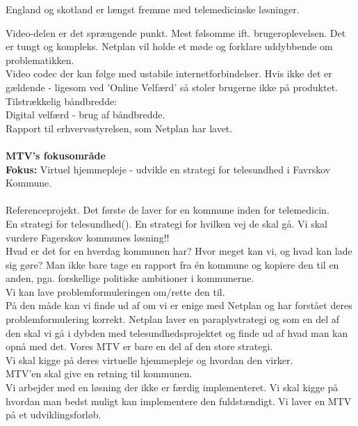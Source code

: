 England og skotland er længst fremme med telemedicinske løsninger. 


Video-delen er det sprængende punkt. Mest følsomme ift. brugeroplevelsen. Det er tungt og kompleks. Netplan vil holde et møde og forklare uddybbende om problematikken. \\
Video codec der kan følge med ustabile internetforbindelser. Hvis ikke det er gældende - ligesom ved 'Online Velfærd' så stoler brugerne ikke på produktet. \\

Tilstrækkelig båndbredde:\\
Digital velfærd - brug af båndbredde.\\
Rapport til erhvervsstyrelsen, som Netplan har lavet.\\\\

\textbf{MTV's fokusområde}\\
\textbf{Fokus:} Virtuel hjemmepleje - udvikle en strategi for telesundhed i Favrskov Kommune.
\\\\
Referenceprojekt. Det første de laver for en kommune inden for telemedicin.\\
En strategi for telesundhed(). En strategi for hvilken vej de skal gå.
Vi skal vurdere Fagerskov kommunes løsning!! \\
Hvad er det for en hverdag kommunen har? Hvor meget kan vi, og hvad kan lade sig gøre? Man ikke bare tage en rapport fra én kommune og kopiere den til en anden, pga. forskellige politiske ambitioner i kommunerne. \\
Vi kan lave problemformuleringen om/rette den til. \\
På den måde kan vi finde ud af om vi er enige med Netplan og har forstået deres problemformulering korrekt. 
Netplan laver en paraplystrategi og som en del af den skal vi gå i dybden med telesundhedsprojektet og finde ud af hvad man kan opnå med det. Vores MTV er bare en del af den store strategi. \\ 
Vi skal kigge på deres virtuelle hjemmepleje og hvordan den virker.\\
MTV'en skal give en retning til kommunen. \\
Vi arbejder med en løsning der ikke er færdig implementeret. Vi skal kigge på hvordan man bedst muligt kan implementere den fuldstændigt. Vi laver en MTV på et udviklingsforløb. 
 
